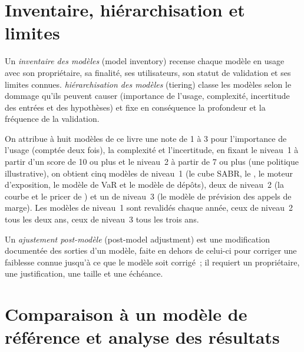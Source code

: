 \section{Inventaire, hiérarchisation et limites}

\begin{definition}\label{def:rc:model-risk-and-validation:inventory}
Un \emph{inventaire des modèles} (model inventory) recense chaque modèle en usage avec son propriétaire, sa finalité,
ses utilisateurs, son statut de validation et ses limites connues. \emph{hiérarchisation des modèles} (tiering) classe
les modèles selon le dommage qu'ils peuvent causer (importance de l'usage, complexité, incertitude
des entrées et des hypothèses) et fixe en conséquence la profondeur et la fréquence de la validation.
\end{definition}

\begin{example}\label{ex:rc:model-risk-and-validation:inventory}
On attribue à huit modèles de ce livre une note de 1 à 3 pour l'importance de l'usage (comptée deux fois), la complexité et
l'incertitude, en fixant le niveau~1 à partir d'un score de 10 ou plus et le niveau~2 à partir de 7 ou plus (une
politique illustrative), on obtient cinq modèles de niveau~1 (le cube SABR, le , le moteur d'exposition, le modèle de VaR
et le modèle de dépôts), deux de niveau~2 (la courbe et le pricer de ) et un de niveau~3 (le
modèle de prévision des appels de marge). Les modèles de niveau~1 sont revalidés chaque année, ceux de niveau~2 tous les deux ans, ceux de niveau~3 tous les trois ans.
\end{example}

\begin{definition}\label{def:rc:model-risk-and-validation:pma}
Un \emph{ajustement post-modèle} (post-model adjustment) est une modification documentée
des sorties d'un modèle, faite en dehors de celui-ci pour corriger une faiblesse connue jusqu'à ce que le modèle soit corrigé~; il requiert un propriétaire, une
justification, une taille et une échéance.
\end{definition}

\section{Comparaison à un modèle de référence et analyse des résultats}

